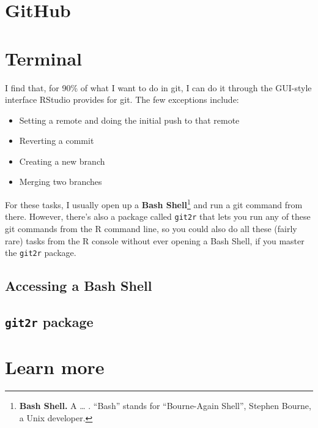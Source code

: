 \documentclass[]{tufte-book}
\providecommand{\tightlist}{%
  \setlength{\itemsep}{0pt}\setlength{\parskip}{0pt}}
\begin{document}
\hypertarget{github}{%
\section{GitHub}\label{github}}

\hypertarget{terminal}{%
\section{Terminal}\label{terminal}}

I find that, for 90\% of what I want to do in git, I can do it through the GUI-style
interface RStudio provides for git. The few exceptions include:

\begin{itemize}
\tightlist
\item
  Setting a remote and doing the initial push to that remote
\item
  Reverting a commit
\item
  Creating a new branch
\item
  Merging two branches
\end{itemize}

For these tasks, I usually open up a \textbf{Bash Shell}\footnote{\textbf{Bash Shell.} A \ldots{} . ``Bash'' stands
  for ``Bourne-Again Shell'', Stephen Bourne, a Unix developer.} and run a git command from
there. However, there's also a package called \texttt{git2r} that lets you run any of these
git commands from the R command line, so you could also do all these (fairly rare) tasks
from the R console without ever opening a Bash Shell, if you master the \texttt{git2r} package.

\hypertarget{accessing-a-bash-shell}{%
\subsection{Accessing a Bash Shell}\label{accessing-a-bash-shell}}

\hypertarget{git2r-package}{%
\subsection{\texorpdfstring{\texttt{git2r} package}{git2r package}}\label{git2r-package}}

\hypertarget{learn-more-1}{%
\section{Learn more}\label{learn-more-1}}
\end{document}
